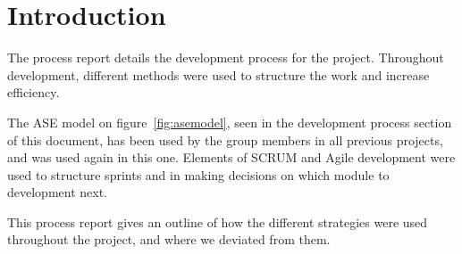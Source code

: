 \chapter{Introduction}
The process report details the development process for the project. Throughout development, different methods were used to structure the work and increase efficiency. 

The ASE model on figure~\ref{fig:asemodel}, seen in the development process section of this document, has been used by the group members in all previous projects, and was used again in this one. Elements of SCRUM and Agile development were used to structure sprints and in making decisions on which module to development next. 

This process report gives an outline of how the different strategies were used throughout the project, and where we deviated from them.
